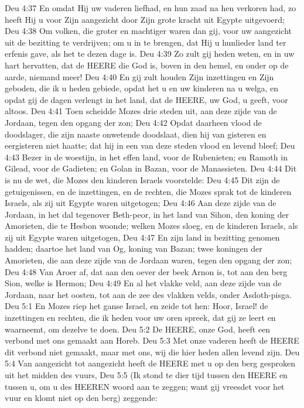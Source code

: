 Deu 4:37  En omdat Hij uw vaderen liefhad, en hun zaad na hen verkoren had, zo heeft Hij u voor Zijn aangezicht door Zijn grote kracht uit Egypte uitgevoerd;
Deu 4:38  Om volken, die groter en machtiger waren dan gij, voor uw aangezicht uit de bezitting te verdrijven; om u in te brengen, dat Hij u hunlieder land ter erfenis gave, als het te dezen dage is.
Deu 4:39  Zo zult gij heden weten, en in uw hart hervatten, dat de HEERE die God is, boven in den hemel, en onder op de aarde, niemand meer!
Deu 4:40  En gij zult houden Zijn inzettingen en Zijn geboden, die ik u heden gebiede, opdat het u en uw kinderen na u welga, en opdat gij de dagen verlengt in het land, dat de HEERE, uw God, u geeft, voor altoos.
Deu 4:41  Toen scheidde Mozes drie steden uit, aan deze zijde van de Jordaan, tegen den opgang der zon;
Deu 4:42  Opdat daarheen vlood de doodslager, die zijn naaste onwetende doodslaat, dien hij van gisteren en eergisteren niet haatte; dat hij in een van deze steden vlood en levend bleef;
Deu 4:43  Bezer in de woestijn, in het effen land, voor de Rubenieten; en Ramoth in Gilead, voor de Gadieten; en Golan in Bazan, voor de Manassieten.
Deu 4:44  Dit is nu de wet, die Mozes den kinderen Israels voorstelde:
Deu 4:45  Dit zijn de getuigenissen, en de inzettingen, en de rechten, die Mozes sprak tot de kinderen Israels, als zij uit Egypte waren uitgetogen;
Deu 4:46  Aan deze zijde van de Jordaan, in het dal tegenover Beth-peor, in het land van Sihon, den koning der Amorieten, die te Hesbon woonde; welken Mozes sloeg, en de kinderen Israels, als zij uit Egypte waren uitgetogen,
Deu 4:47  En zijn land in bezitting genomen hadden; daartoe het land van Og, koning van Bazan; twee koningen der Amorieten, die aan deze zijde van de Jordaan waren, tegen den opgang der zon;
Deu 4:48  Van Aroer af, dat aan den oever der beek Arnon is, tot aan den berg Sion, welke is Hermon;
Deu 4:49  En al het vlakke veld, aan deze zijde van de Jordaan, naar het oosten, tot aan de zee des vlakken velds, onder Asdoth-pisga.
Deu 5:1  En Mozes riep het ganse Israel, en zeide tot hen: Hoor, Israel! de inzettingen en rechten, die ik heden voor uw oren spreek, dat gij ze leert en waarneemt, om dezelve te doen.
Deu 5:2  De HEERE, onze God, heeft een verbond met ons gemaakt aan Horeb.
Deu 5:3  Met onze vaderen heeft de HEERE dit verbond niet gemaakt, maar met ons, wij die hier heden allen levend zijn.
Deu 5:4  Van aangezicht tot aangezicht heeft de HEERE met u op den berg gesproken uit het midden des vuurs,
Deu 5:5  (Ik stond te dier tijd tussen den HEERE en tussen u, om u des HEEREN woord aan te zeggen; want gij vreesdet voor het vuur en klomt niet op den berg) zeggende:
